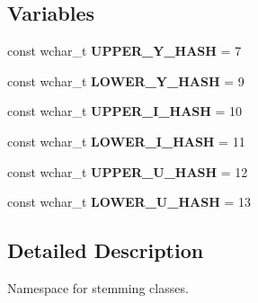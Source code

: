 \subsection*{Variables}
\begin{DoxyCompactItemize}
\item 
const wchar\+\_\+t {\bfseries U\+P\+P\+E\+R\+\_\+\+Y\+\_\+\+H\+A\+SH} = 7\label{namespacestemming_a5d720e7c3e7ec49b57a7b39cfaba90af}

\item 
const wchar\+\_\+t {\bfseries L\+O\+W\+E\+R\+\_\+\+Y\+\_\+\+H\+A\+SH} = 9\label{namespacestemming_af29db03997ddc958253bf6aab7cd8985}

\item 
const wchar\+\_\+t {\bfseries U\+P\+P\+E\+R\+\_\+\+I\+\_\+\+H\+A\+SH} = 10\label{namespacestemming_a275ebb867508b45937921885d0a37f65}

\item 
const wchar\+\_\+t {\bfseries L\+O\+W\+E\+R\+\_\+\+I\+\_\+\+H\+A\+SH} = 11\label{namespacestemming_a7454947ea4acf69afb5c54094c257ff4}

\item 
const wchar\+\_\+t {\bfseries U\+P\+P\+E\+R\+\_\+\+U\+\_\+\+H\+A\+SH} = 12\label{namespacestemming_a05756eb1c8cd1fafce3981d8a7222cac}

\item 
const wchar\+\_\+t {\bfseries L\+O\+W\+E\+R\+\_\+\+U\+\_\+\+H\+A\+SH} = 13\label{namespacestemming_a9b593f99cd2777a364983cd5f9dbe1ef}

\end{DoxyCompactItemize}


\subsection{Detailed Description}
Namespace for stemming classes. 